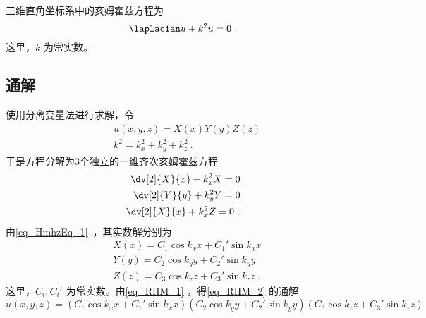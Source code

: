 

三维直角坐标系中的亥姆霍兹方程为
\begin{equation}\label{eq_RHM_2}
\laplacian u+k^2u=0~.
\end{equation}
这里，$k$ 为常实数。
\subsection{通解}
使用分离变量法进行求解，令
\begin{equation}\label{eq_RHM_1}
\begin{aligned}
&u(x,y,z)=X(x)Y(y)Z(z)\\
&k^2=k_x^2+k_y^2+k_z^2~.
\end{aligned}
\end{equation}
于是方程分解为3个独立的一维齐次亥姆霍兹方程
\begin{equation}
\begin{aligned}
\dv[2]{X}{x}+k_x^2X=0\\
\dv[2]{Y}{y}+k_y^2Y=0\\
\dv[2]{X}{x}+k_x^2Z=0~.
\end{aligned}
\end{equation}
由\autoref{eq_HmhzEq_1}~，其实数解分别为
\begin{equation}
\begin{aligned}
&X(x)=C_1\cos k_xx+C_1'\sin k_xx\\
&Y(y)=C_2\cos k_yy+C_2'\sin k_yy\\
&Z(z)=C_3\cos k_zz+C_3'\sin k_zz~.
\end{aligned}
\end{equation}
这里，$C_i,C_i'$ 为常实数。由\autoref{eq_RHM_1} ，得\autoref{eq_RHM_2} 的通解
\begin{equation}\label{eq_RHM_3}
u(x,y,z)=(C_1\cos k_xx+C_1'\sin k_xx)(C_2\cos k_yy+C_2'\sin k_yy)(C_3\cos k_zz+C_3'\sin k_zz)
\end{equation}
